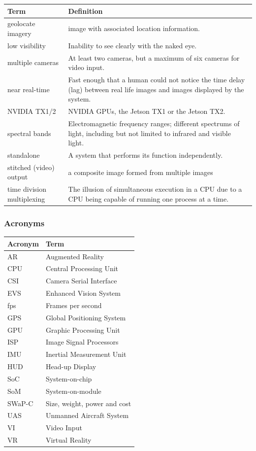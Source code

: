 \documentclass[letterpaper,10pt,serif,draftclsnofoot,onecolumn,compsoc,titlepage]{IEEEtran}
\begin{document}
\begin{tabular}{|l|p{11cm}|}
	\hline
	\textbf{Term} & \textbf{Definition}\\
	\hline
	geolocate imagery & image with associated location information.\\
	\hline
	low visibility & Inability to see clearly with the naked eye.\\
	\hline	
	multiple cameras & At least two cameras, but a maximum of six cameras for 
	video input.\\
	\hline
	near real-time & Fast enough that a human could not notice the time 
	delay (lag) between \newline real life images and images displayed by the system.\\
	\hline
	NVIDIA TX1/2 & NVIDIA GPUs, the Jetson TX1 or the Jetson TX2.\\
	\hline
	spectral bands & Electromagnetic frequency ranges; different 
	spectrums of light, including \newline but not limited to infrared 
	and visible light.\\
	\hline
	standalone & A system that performs its function independently. \\
	\hline
	stitched (video) output & a composite image formed from multiple images\\
	\hline
	time division multiplexing & The illusion of simultaneous execution in a CPU due
	to a CPU being capable of running one process at a time.\\
	\hline
\end{tabular}

\subsubsection{Acronyms}

\begin{tabular}{|l|l|}
	\hline
	\textbf{Acronym} & \textbf{Term}\\
	\hline
	AR & Augmented Reality\\
	\hline
	CPU & Central Processing Unit\\
	\hline
	CSI & Camera Serial Interface\\
	\hline
	EVS & Enhanced Vision System\\
	\hline
	fps & Frames per second\\
	\hline
	GPS & Global Positioning System\\
	\hline
	GPU & Graphic Processing Unit\\
	\hline
	ISP & Image Signal Processors\\
	\hline
	IMU & Inertial Measurement Unit\\
	\hline
	HUD & Head-up Display\\
	\hline
	SoC & System-on-chip\\
	\hline
	SoM & System-on-module\\
	\hline
	SWaP-C & Size, weight, power and cost\\
	\hline
	UAS & Unmanned Aircraft System\\
	\hline
	VI & Video Input\\
	\hline
	VR & Virtual Reality\\
	\hline
\end{tabular}
\end{document}
